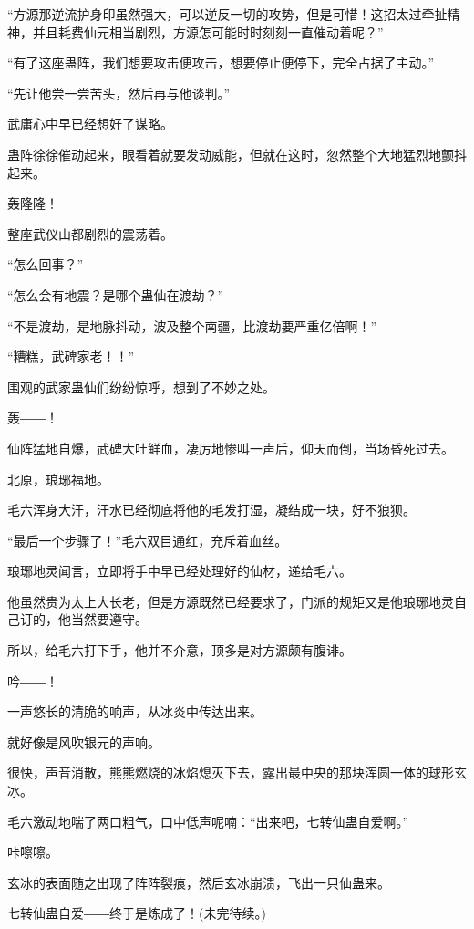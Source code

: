 \begin{this_body}
“方源那逆流护身印虽然强大，可以逆反一切的攻势，但是可惜！这招太过牵扯精神，并且耗费仙元相当剧烈，方源怎可能时时刻刻一直催动着呢？”

“有了这座蛊阵，我们想要攻击便攻击，想要停止便停下，完全占据了主动。”

“先让他尝一尝苦头，然后再与他谈判。”

武庸心中早已经想好了谋略。

蛊阵徐徐催动起来，眼看着就要发动威能，但就在这时，忽然整个大地猛烈地颤抖起来。

轰隆隆！

整座武仪山都剧烈的震荡着。

“怎么回事？”

“怎么会有地震？是哪个蛊仙在渡劫？”

“不是渡劫，是地脉抖动，波及整个南疆，比渡劫要严重亿倍啊！”

“糟糕，武碑家老！！”

围观的武家蛊仙们纷纷惊呼，想到了不妙之处。

轰――！

仙阵猛地自爆，武碑大吐鲜血，凄厉地惨叫一声后，仰天而倒，当场昏死过去。

北原，琅琊福地。

毛六浑身大汗，汗水已经彻底将他的毛发打湿，凝结成一块，好不狼狈。

“最后一个步骤了！”毛六双目通红，充斥着血丝。

琅琊地灵闻言，立即将手中早已经处理好的仙材，递给毛六。

他虽然贵为太上大长老，但是方源既然已经要求了，门派的规矩又是他琅琊地灵自己订的，他当然要遵守。

所以，给毛六打下手，他并不介意，顶多是对方源颇有腹诽。

吟――！

一声悠长的清脆的响声，从冰炎中传达出来。

就好像是风吹银元的声响。

很快，声音消散，熊熊燃烧的冰焰熄灭下去，露出最中央的那块浑圆一体的球形玄冰。

毛六激动地喘了两口粗气，口中低声呢喃：“出来吧，七转仙蛊自爱啊。”

咔嚓嚓。

玄冰的表面随之出现了阵阵裂痕，然后玄冰崩溃，飞出一只仙蛊来。

七转仙蛊自爱――终于是炼成了！(未完待续。)

\end{this_body}

